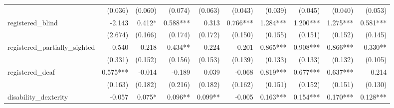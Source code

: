 \begin{tabular}{lrrrrrrrrr}
                             &                        (0.036) &                     (0.060) &                         (0.074) &                          (0.063) &                     (0.043) &                     (0.039) &                         (0.045) &                          (0.040) &                    (0.053) \\ 
registered_blind             &                         -2.143 &                      0.412* &                        0.588*** &                            0.313 &                    0.766*** &                    1.284*** &                        1.200*** &                         1.275*** &                   0.581*** \\ 
                             &                        (2.674) &                     (0.166) &                         (0.174) &                          (0.172) &                     (0.150) &                     (0.155) &                         (0.151) &                          (0.152) &                    (0.145) \\ 
registered_partially_sighted &                         -0.540 &                       0.218 &                         0.434** &                            0.224 &                       0.201 &                    0.865*** &                        0.908*** &                         0.866*** &                    0.330** \\ 
                             &                        (0.331) &                     (0.152) &                         (0.156) &                          (0.153) &                     (0.139) &                     (0.133) &                         (0.133) &                          (0.132) &                    (0.105) \\ 
registered_deaf              &                       0.575*** &                      -0.014 &                          -0.189 &                            0.039 &                      -0.068 &                    0.819*** &                        0.677*** &                         0.637*** &                      0.214 \\ 
                             &                        (0.163) &                     (0.182) &                         (0.216) &                          (0.182) &                     (0.162) &                     (0.151) &                         (0.152) &                          (0.151) &                    (0.130) \\ 
disability_dexterity         &                         -0.057 &                      0.075* &                         0.096** &                          0.099** &                      -0.005 &                    0.163*** &                        0.154*** &                         0.170*** &                   0.128*** \\ 

\end{tabular}
